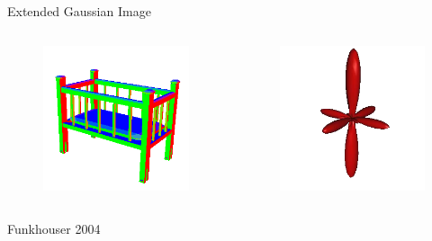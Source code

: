 \documentclass{beamer}
\begin{document}
\begin{frame}{Extended Gaussian Image}

\begin{columns}[c]

\begin{figure}[t]
    \includegraphics[width=\textwidth]{Crib.png}
\end{figure}

\begin{figure}[t]
    \includegraphics[width=\textwidth]{EGICrib.png}
\end{figure}

\end{columns}

\small Funkhouser 2004

\end{frame}
\end{document}
